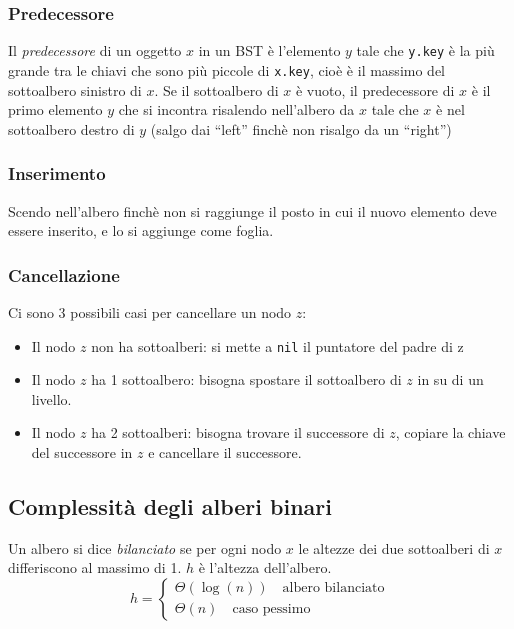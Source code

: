 \documentclass[10pt,a4paper]{article}
\newcommand{\code}{\texttt}
\begin{document}
\begin{multicols*}{2}
\subsubsection*{Predecessore}
Il \emph{predecessore} di un oggetto $x$ in un BST è l'elemento $y$ tale che \code{y.key} è la più grande tra le chiavi che sono più piccole di \code{x.key}, cioè è il massimo del sottoalbero sinistro di $x$. Se il sottoalbero di $x$ è vuoto, il predecessore di $x$ è il primo elemento $y$ che si incontra risalendo nell'albero da $x$ tale che $x$ è nel sottoalbero destro di $y$ (\small{salgo dai ``left'' finchè non risalgo da un ``right''})

\subsubsection*{Inserimento}
Scendo nell'albero finchè non si raggiunge il posto in cui il nuovo elemento deve essere inserito, e lo si aggiunge come foglia.

\subsubsection*{Cancellazione} Ci sono 3 possibili casi per cancellare un nodo $z$:
    \begin{itemize}
        \item Il nodo $z$ non ha sottoalberi: si mette a \code{nil} il puntatore del padre di z
        \item Il nodo $z$ ha 1 sottoalbero: bisogna spostare il sottoalbero di $z$ in su di un livello.
        \item Il nodo $z$ ha 2 sottoalberi: bisogna trovare il successore di $z$, copiare la chiave del successore in $z$ e cancellare il successore.
    \end{itemize}
\subsection*{Complessità degli alberi binari}
Un albero si dice \emph{bilanciato} se per ogni nodo $x$ le altezze dei due sottoalberi di $x$ differiscono al massimo di 1.
$h$ è l'altezza dell'albero. 
\begin{equation*}
    h = \begin{cases}
        \varTheta(\log(n)) \quad \text{albero bilanciato}\\
        \varTheta(n)\quad \text{caso pessimo}
    \end{cases}
\end{equation*}


\end{multicols*}
\end{document}
